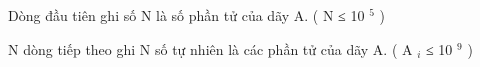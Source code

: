 Dòng đầu tiên ghi số N là số phần tử của dãy A. ( N ≤ 10   $^    5   $   )  

   N dòng tiếp theo ghi N số tự nhiên là các phần tử của dãy A. (  A   $_    i   $   ≤ 10   $^    9   $   )